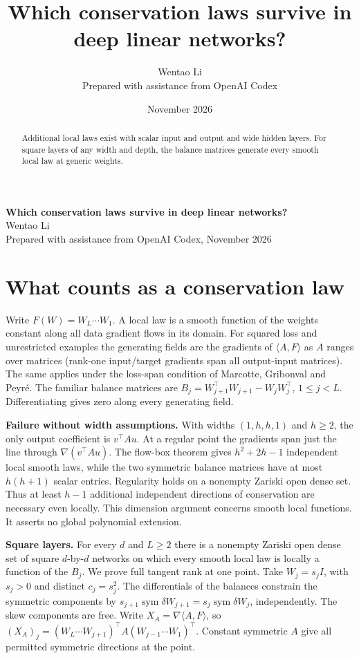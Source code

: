 \documentclass[10pt]{article}
\title{Which conservation laws survive in deep linear networks?}
\author{Wentao Li\\{\small Prepared with assistance from OpenAI Codex}}
\date{November 2026}
\begin{document}
\begin{center}{\Large\bfseries Which conservation laws survive in deep linear networks?}\\[3pt]Wentao Li\\{\small Prepared with assistance from OpenAI Codex, November 2026}\end{center}
\begin{abstract}
Additional local laws exist with scalar input and output and wide hidden layers. For square layers of any width and depth, the balance matrices generate every smooth local law at generic weights.
\end{abstract}
\section*{What counts as a conservation law}
Write $F(W)=W_L\cdots W_1$. A local law is a smooth function of the weights constant along all data gradient flows in its domain. For squared loss and unrestricted examples the generating fields are the gradients of $\langle A,F\rangle$ as $A$ ranges over matrices (rank-one input/target gradients span all output-input matrices). The same applies under the loss-span condition of Marcotte, Gribonval and Peyré. The familiar balance matrices are $B_j=W_{j+1}^\top W_{j+1}-W_jW_j^\top$, $1\le j<L$. Differentiating gives zero along every generating field.

\textbf{Failure without width assumptions.} With widths $(1,h,h,1)$ and $h\ge2$, the only output coefficient is $v^\top A u$. At a regular point the gradients span just the line through $\nabla(v^\top Au)$. The flow-box theorem gives $h^2+2h-1$ independent local smooth laws, while the two symmetric balance matrices have at most $h(h+1)$ scalar entries. Regularity holds on a nonempty Zariski open dense set. Thus at least $h-1$ additional independent directions of conservation are necessary even locally. This dimension argument concerns smooth local functions. It asserts no global polynomial extension.

\textbf{Square layers.} For every $d$ and $L\ge2$ there is a nonempty Zariski open dense set of square $d$-by-$d$ networks on which every smooth local law is locally a function of the $B_j$. We prove full tangent rank at one point. Take $W_j=s_j I$, with $s_j>0$ and distinct $c_j=s_j^2$. The differentials of the balances constrain the symmetric components by $s_{j+1}\operatorname{sym}\delta W_{j+1}=s_j\operatorname{sym}\delta W_j$, independently. The skew components are free. Write $X_A=\nabla\langle A,F\rangle$, so $(X_A)_j=(W_L\cdots W_{j+1})^\top A(W_{j-1}\cdots W_1)^\top$. Constant symmetric $A$ give all permitted symmetric directions at the point.
\end{document}

